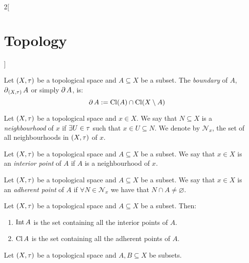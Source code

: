 \documentclass[../../../main.tex]{subfiles}
\begin{document}
\begin{multicols}{2}[\section{Topology}]
\begin{prop}
\begin{itemize}
        \end{itemize}
    \end{prop}
    \begin{definition}
        Let $(X,\tau)$ be a topological space and $A\subseteq X$ be a subset. The \emph{boundary} of $A$, $\operatorname{\partial}_{(X,\tau)}A$ or simply $\operatorname{\partial} A$, is: $$\operatorname{\partial} A:=\operatorname{Cl}(A)\cap\operatorname{Cl}(X\setminus A)$$
    \end{definition}
    \begin{definition}
        Let $(X,\tau)$ be a topological space and $x\in X$. We say that $N\subseteq X$ is a \emph{neighbourhood} of $x$ if $\exists U\in\tau$ such that $x\in U\subseteq N$. We denote by $\mathcal{N}_x$, the set of all neighbourhoods in $(X,\tau)$ of $x$.
    \end{definition}
    \begin{definition}
        Let $(X,\tau)$ be a topological space and $A\subseteq X$ be a subset. We say that $x\in X$ is an \emph{interior point} of $A$ if $A$ is a neighbourhood of $x$.
    \end{definition}
    \begin{definition}
        Let $(X,\tau)$ be a topological space and $A\subseteq X$ be a subset. We say that $x\in X$ is an \emph{adherent point} of $A$ if $\forall N\in\mathcal{N}_x$ we have that $N\cap A\ne\varnothing$.
    \end{definition}
    \begin{prop}
        Let $(X,\tau)$ be a topological space and $A\subseteq X$ be a subset. Then:
        \begin{enumerate}
            \item $\operatorname{Int} A$ is the set containing all the interior points of $A$.
            \item $\operatorname{Cl} A$ is the set containing all the adherent points of $A$.
        \end{enumerate}
    \end{prop}
    \begin{prop}
        Let $(X,\tau)$ be a topological space and $A,B\subseteq X$ be subsets.


\end{prop}
\end{multicols}
\end{document}
